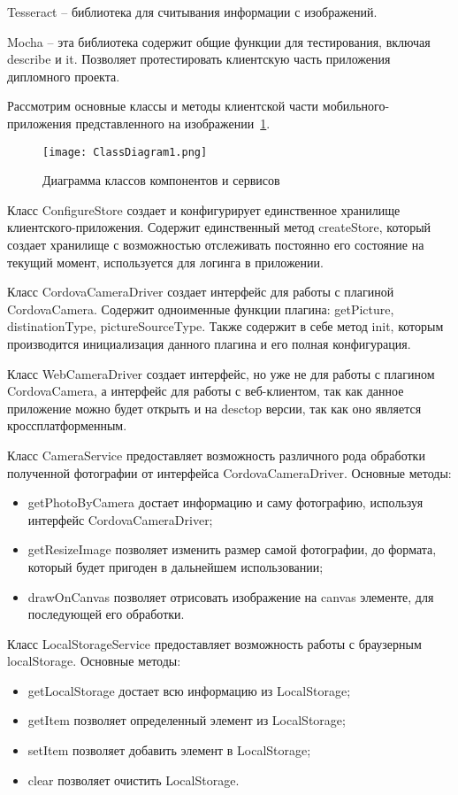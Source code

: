 Tesseract -- библиотека для считывания информации с изображений.

Mocha -- эта библиотека содержит общие функции для тестирования, включая describe и it. Позволяет протестировать клиентскую часть приложения дипломного проекта.

Рассмотрим основные классы и методы клиентской части мобильного-приложения представленного на изображении~\ref{fig:domain:manual_structure:client_class}.

\begin{figure}[ht]
\centering
  \texttt{[image: ClassDiagram1.png]}  
  \caption{Диаграмма классов компонентов и сервисов}
  \label{fig:domain:manual_structure:client_class}
\end{figure}

Класс ConfigureStore создает и конфигурирует единственное хранилище клиентского-приложения. Содержит единственный метод createStore, который создает хранилище с возможностью отслеживать постоянно его состояние на текущий момент, используется для логинга в приложении.

Класс CordovaCameraDriver создает интерфейс для работы с плагиной CordovaCamera. Содержит одноименные функции плагина: getPicture, distinationType, pictureSourceType. Также содержит в себе метод init, которым производится инициализация данного плагина и его полная конфигурация.

Класс WebCameraDriver создает интерфейс, но уже не для работы с плагином CordovaCamera, а интерфейс для работы с веб-клиентом, так как данное приложение можно будет открыть и на desctop версии, так как оно является кроссплатформенным.

Класс CameraService предоставляет возможность различного рода обработки полученной фотографии от интерфейса CordovaCameraDriver. Основные методы:
\begin{itemize}
  \item getPhotoByCamera достает информацию и саму фотографию, используя интерфейс CordovaCameraDriver;
  \item getResizeImage позволяет изменить размер самой фотографии, до формата, который будет пригоден в дальнейшем использовании;
  \item drawOnCanvas позволяет отрисовать изображение на canvas элементе, для последующей его обработки.
\end{itemize}

Класс LocalStorageService предоставляет возможность работы с браузерным localStorage. Основные методы:
\begin{itemize}
  \item getLocalStorage достает всю информацию из LocalStorage;
  \item getItem позволяет определенный элемент из LocalStorage;
  \item setItem позволяет добавить элемент в LocalStorage;
  \item clear позволяет очистить LocalStorage.
\end{itemize}

